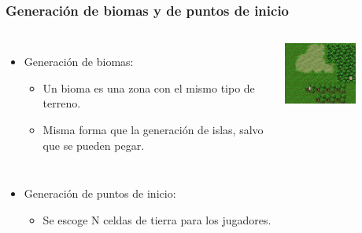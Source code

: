 \begin{frame}
	\frametitle{Generación de biomas y de puntos de inicio}
	
	\begin{columns}
		
		\begin{itemize}
			\item<1-> \textcolor{UDCpink}{Generación de biomas}:
			
			\vspace{0.5em}
			
			\begin{itemize}
				\item<1-> Un bioma es una zona con el \textcolor{UDCpink}{mismo tipo de terreno}.
				
				\vspace{0.5em}
				
				\item<2-> Misma forma que la generación de islas, salvo que se pueden \textcolor{UDCpink}{pegar}.
			\end{itemize}
		\end{itemize}
		
		\centering
		\includegraphics[width=0.6\textwidth]{images/biomas.png}
		
	\end{columns}
	
	\vspace{1em}
	
	\begin{itemize}
		\item<3-> \textcolor{UDCpink}{Generación de puntos de inicio}:
		
		\vspace{0.5em}
		
		\begin{itemize}
			\item<3-> Se escoge N celdas de tierra para los jugadores.
			

\end{itemize}
\end{itemize}
\end{frame}
